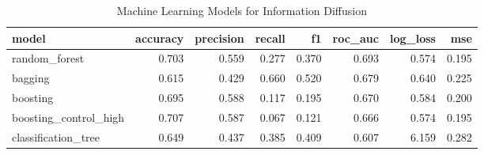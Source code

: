 \begin{table}
\caption{Machine Learning Models for Information Diffusion}
\label{tab:diffusion_ml}
\begin{tabular}{lrrrrrrr}
\toprule
model & accuracy & precision & recall & f1 & roc_auc & log_loss & mse \\
\midrule
random_forest & 0.703 & 0.559 & 0.277 & 0.370 & 0.693 & 0.574 & 0.195 \\
bagging & 0.615 & 0.429 & 0.660 & 0.520 & 0.679 & 0.640 & 0.225 \\
boosting & 0.695 & 0.588 & 0.117 & 0.195 & 0.670 & 0.584 & 0.200 \\
boosting_control_high & 0.707 & 0.587 & 0.067 & 0.121 & 0.666 & 0.574 & 0.195 \\
classification_tree & 0.649 & 0.437 & 0.385 & 0.409 & 0.607 & 6.159 & 0.282 \\
\bottomrule
\end{tabular}
\end{table}
